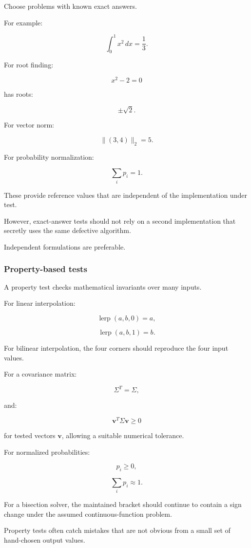 Choose problems with known exact answers.

For example:

\[ \int_0^1x^2\,dx=\frac13. \]

For root finding:

\[ x^2-2=0 \]

has roots:

\[ \pm\sqrt2. \]

For vector norm:

\[ \|(3,4)\|_2=5. \]

For probability normalization:

\[ \sum_ip_i=1. \]

These provide reference values that are independent of the implementation under test.

However, exact-answer tests should not rely on a second implementation that secretly uses the same defective algorithm.

Independent formulations are preferable.

\subsubsection{Property-based tests}\label{02-foundations-ii-ch031-property-based-tests}

A property test checks mathematical invariants over many inputs.

For linear interpolation:

\[ \operatorname{lerp}(a,b,0)=a, \]

\[ \operatorname{lerp}(a,b,1)=b. \]

For bilinear interpolation, the four corners should reproduce the four input values.

For a covariance matrix:

\[ \Sigma^T=\Sigma, \]

and:

\[ \mathbf v^T\Sigma\mathbf v\ge0 \]

for tested vectors \(\mathbf v\), allowing a suitable numerical tolerance.

For normalized probabilities:

\[ p_i\ge0, \]

\[ \sum_ip_i\approx1. \]

For a bisection solver, the maintained bracket should continue to contain a sign change under the assumed continuous-function problem.

Property tests often catch mistakes that are not obvious from a small set of hand-chosen output values.

